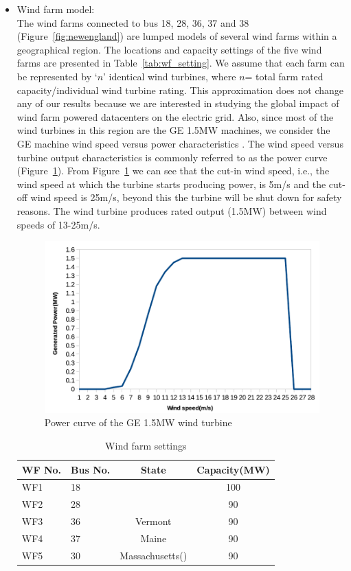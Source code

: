 \begin{itemize}
\item{Wind farm model: \\
The wind farms connected to bus 18, 28, 36, 37 and 38 (Figure~\ref{fig:newengland}) are lumped models of several wind farms within a geographical region. The locations and capacity settings of the five wind farms are presented in Table~\ref{tab:wf_setting}. We assume that each farm can be represented by `$n$' identical wind turbines, where $n$= total farm rated capacity/individual wind turbine rating. This approximation does not change any of our results because we are interested in studying the global impact of wind farm powered datacenters on the electric grid. Also, since most of the wind turbines in this region are the GE 1.5MW machines, we consider the GE machine wind speed versus power characteristics \cite{lei2006modeling}. The wind speed versus turbine output characteristics is commonly referred to as the power curve (Figure~\ref{fig:windcurve}). From Figure~\ref{fig:windcurve} we can see that the cut-in wind speed, i.e., the wind speed at which the turbine starts producing power, is 5m/s and the cut-off wind speed is 25m/s, beyond this the turbine will be shut down for safety reasons. The wind turbine produces rated output (1.5MW) between wind speeds of 13-25m/s.
\begin{figure}[ht]
\centering
\includegraphics[width=1\columnwidth]{img/wind_curve.pdf}
\caption{Power curve of the GE 1.5MW wind turbine}
\label{fig:windcurve}
\end{figure}


\begin{table}[ht]
\begin{center}
\caption{Wind farm settings}
\begin{tabular}{|l|l|c|c|}
\hline
WF No. & Bus No. & State & Capacity(MW) \\
\hline
WF1 & 18& \xynote{?} & 100\\
WF2 & 28& \xynote{?} & 90 \\
WF3 & 36& Vermont & 90  \\
WF4 & 37& Maine & 90\\
WF5 & 30& Massachusetts(\xynote{?}) & 90\\
\hline


\end{tabular}
\end{center}
\end{table}}
\end{itemize}
